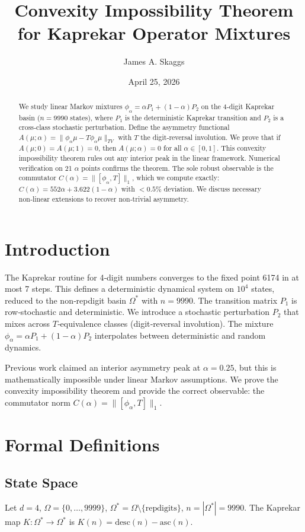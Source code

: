 \documentclass[12pt]{article}
\title{Convexity Impossibility Theorem for Kaprekar Operator Mixtures}
\author{James A. Skaggs}
\date{April 25, 2026}
\begin{document}
\maketitle

\begin{abstract}
We study linear Markov mixtures $\phi_\alpha = \alpha P_1 + (1-\alpha)P_2$ on the 4‑digit Kaprekar basin ($n=9990$ states), where $P_1$ is the deterministic Kaprekar transition and $P_2$ is a cross‑class stochastic perturbation. Define the asymmetry functional $A(\mu;\alpha)=\|\phi_\alpha\mu - T\phi_\alpha\mu\|_{TV}$ with $T$ the digit‑reversal involution. We prove that if $A(\mu;0)=A(\mu;1)=0$, then $A(\mu;\alpha)=0$ for all $\alpha\in[0,1]$. This convexity impossibility theorem rules out any interior peak in the linear framework. Numerical verification on 21 $\alpha$ points confirms the theorem. The sole robust observable is the commutator $C(\alpha)=\|[\phi_\alpha,T]\|_1$, which we compute exactly: $C(\alpha)=552\alpha + 3.622(1-\alpha)$ with $<0.5\%$ deviation. We discuss necessary non‑linear extensions to recover non‑trivial asymmetry.
\end{abstract}

\section{Introduction}
The Kaprekar routine for 4‑digit numbers converges to the fixed point 6174 in at most 7 steps. This defines a deterministic dynamical system on $10^4$ states, reduced to the non‑repdigit basin $\Omega^*$ with $n=9990$. The transition matrix $P_1$ is row‑stochastic and deterministic. We introduce a stochastic perturbation $P_2$ that mixes across $T$‑equivalence classes (digit‑reversal involution). The mixture $\phi_\alpha = \alpha P_1 + (1-\alpha)P_2$ interpolates between deterministic and random dynamics.

Previous work claimed an interior asymmetry peak at $\alpha=0.25$, but this is mathematically impossible under linear Markov assumptions. We prove the convexity impossibility theorem and provide the correct observable: the commutator norm $C(\alpha)=\|[\phi_\alpha,T]\|_1$.

\section{Formal Definitions}

\subsection{State Space}
Let $d=4$, $\Omega = \{0,\ldots,9999\}$, $\Omega^* = \Omega \setminus \{\text{repdigits}\}$, $n=|\Omega^*|=9990$.
The Kaprekar map $K:\Omega^*\to\Omega^*$ is $K(n)=\text{desc}(n)-\text{asc}(n)$.
\end{document}

